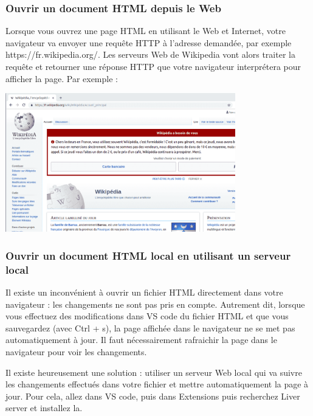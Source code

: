 \documentclass[a4paper]{article}
\begin{document}
\subsubsection{Ouvrir un document {\color{monOrange}HTML} depuis le {\color{monOrange}Web}}
Lorsque vous ouvrez une page {\color{monOrange}HTML} en utilisant le {\color{monOrange}Web} et {\color{monOrange}Internet}, votre navigateur va envoyer une requête HTTP à l'adresse demandée, par exemple {\color{monOrange}https://fr.wikipedia.org/}. Les serveurs {\color{monOrange}Web} de {\color{monOrange}Wikipedia} vont alors traiter la requête et retourner une réponse {\color{monOrange}HTTP} que votre navigateur interprétera pour afficher la page. Par exemple :
\begin{center}
\includegraphics[width=10cm]{images/image03.png}
\end{center}

\subsubsection{Ouvrir un document {\color{monOrange}HTML} local en utilisant un serveur local}
Il existe un inconvénient à ouvrir un fichier {\color{monOrange}HTML} directement dans votre navigateur : les changements ne sont pas pris en compte. Autrement dit, lorsque vous effectuez des modifications dans {\color{monOrange}VS code} du fichier {\color{monOrange}HTML} et que vous sauvegardez (avec {\color{monOrange}Ctrl + s}), la page affichée dans le navigateur ne se met pas automatiquement à jour. Il faut nécessairement rafraichir la page dans le navigateur pour voir les changements.

Il existe heureusement une solution : utiliser un serveur {\color{monOrange}Web} local qui va suivre les changements effectués dans votre fichier et mettre automatiquement la page à jour. Pour cela, allez dans {\color{monOrange}VS code}, puis dans {\color{monOrange}Extensions} puis recherchez {\color{monOrange}Liver server} et installez la.
\end{document}
